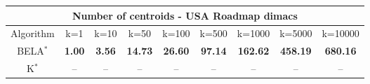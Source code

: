 \begin{tabular}{c|cccccccc}\toprule
\multicolumn{9}{c}{Number of centroids - USA Roadmap dimacs}\\ \midrule
Algorithm & k=1 & k=10 & k=50 & k=100 & k=500 & k=1000 & k=5000 & k=10000 \\ \midrule
BELA$^*$ & \textbf{1.00} & \textbf{3.56} & \textbf{14.73} & \textbf{26.60} & \textbf{97.14} & \textbf{162.62} & \textbf{458.19} & \textbf{680.16} \\
K$^*$ & -- & -- & -- & -- & -- & -- & -- & -- \\ \bottomrule 
\end{tabular}
